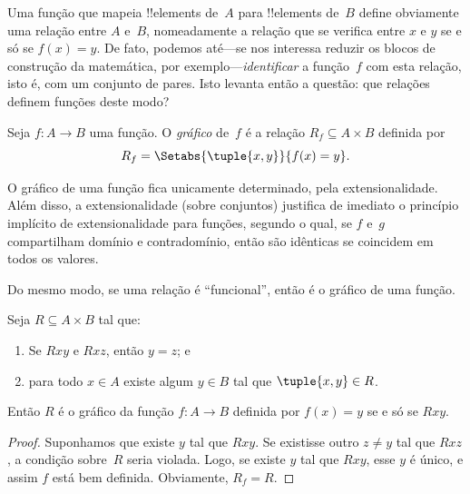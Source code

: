 \documentclass[../../../include/open-logic-section]{subfiles}
\begin{document}


\begin{explain}
Uma função que mapeia !!{element}s de~$A$ para !!{element}s de~$B$
define obviamente uma relação entre $A$ e~$B$, nomeadamente a relação
que se verifica entre $x$ e $y$ se e só se $f(x) = y$. De fato, podemos
até---se nos interessa reduzir os blocos de construção da
matemática, por exemplo---\emph{identificar} a função~$f$ com esta
relação, isto é, com um conjunto de pares. Isto levanta então a questão:
que relações definem funções deste modo?
\end{explain}

\begin{defn} Seja $f\colon A \to B$ uma função.
O \emph{gráfico} de~$f$ é a relação $R_f \subseteq A \times B$
definida por
\[
R_f = \Setabs{\tuple{x,y}}{f(x) = y}.
\]
\end{defn}

\begin{explain}
O gráfico de uma função fica unicamente determinado, pela extensionalidade.
Além disso, a extensionalidade (sobre conjuntos) justifica de imediato o
princípio implícito de extensionalidade para funções,
segundo o qual, se $f$ e~$g$ compartilham domínio e contradomínio, então são
idênticas se coincidem em todos os valores.

Do mesmo modo, se uma relação é ``funcional'', então é o gráfico de uma função.
\end{explain}

\begin{prop}
Seja $R \subseteq A \times B$ tal que:
\begin{enumerate}
\item Se $Rxy$ e $Rxz$, então $y = z$; e
\item para todo $x \in A$ existe algum $y \in B$ tal que $\tuple{x,
y} \in R$.
\end{enumerate}
Então $R$ é o gráfico da função $f\colon A \to B$ definida por
$f(x) = y$ se e só se $Rxy$.
\end{prop}

\begin{proof}
Suponhamos que existe $y$ tal que $Rxy$. Se existisse outro $z \neq
y$ tal que $Rxz$, a condição sobre~$R$ seria violada. Logo, se
existe $y$ tal que $Rxy$, esse $y$ é único, e assim $f$ está
bem definida. Obviamente, $R_f = R$.
\end{proof}
\end{document}
